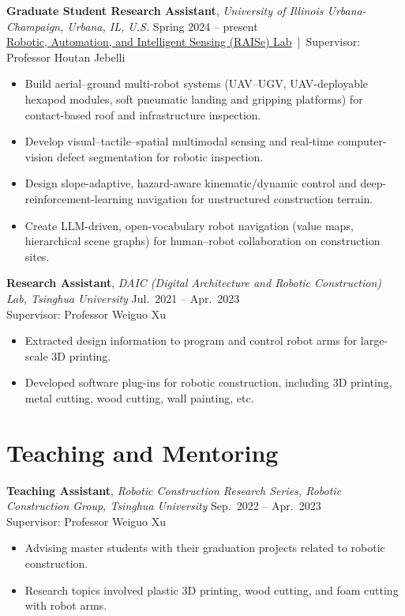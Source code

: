 \documentclass[11pt,a4paper]{article}
\newcommand{\entrytitle}[1]{\textbf{#1}}
\newcommand{\entrydetail}[1]{\textit{#1}}
\begin{document}
\entrytitle{Graduate Student Research Assistant}, \entrydetail{University of Illinois Urbana-Champaign, Urbana, IL, U.S.} \hfill Spring 2024 -- present \\
\href{https://raiselab.cee.illinois.edu/}{Robotic, Automation, and Intelligent Sensing (RAISe) Lab} \,|\, Supervisor: Professor Houtan Jebelli
\begin{itemize}[nosep, leftmargin=1.5em]
    \item Build aerial--ground multi-robot systems (UAV--UGV, UAV-deployable hexapod modules, soft pneumatic landing and gripping platforms) for contact-based roof and infrastructure inspection.
    \item Develop visual--tactile--spatial multimodal sensing and real-time computer-vision defect segmentation for robotic inspection.
    \item Design slope-adaptive, hazard-aware kinematic/dynamic control and deep-reinforcement-learning navigation for unstructured construction terrain.
    \item Create LLM-driven, open-vocabulary robot navigation (value maps, hierarchical scene graphs) for human--robot collaboration on construction sites.
\end{itemize}

\entrytitle{Research Assistant}, \entrydetail{DAIC (Digital Architecture and Robotic Construction) Lab, Tsinghua University} \hfill Jul.\ 2021 -- Apr.\ 2023 \\
Supervisor: Professor Weiguo Xu
\begin{itemize}[nosep, leftmargin=1.5em]
    \item Extracted design information to program and control robot arms for large-scale 3D printing.
    \item Developed software plug-ins for robotic construction, including 3D printing, metal cutting, wood cutting, wall painting, etc.
\end{itemize}

\section{Teaching and Mentoring}

\entrytitle{Teaching Assistant}, \entrydetail{Robotic Construction Research Series, Robotic Construction Group, Tsinghua University} \hfill Sep.\ 2022 -- Apr.\ 2023 \\
Supervisor: Professor Weiguo Xu
\begin{itemize}[nosep, leftmargin=1.5em]
    \item Advising master students with their graduation projects related to robotic construction.
    \item Research topics involved plastic 3D printing, wood cutting, and foam cutting with robot arms.
\end{itemize}
\end{document}
